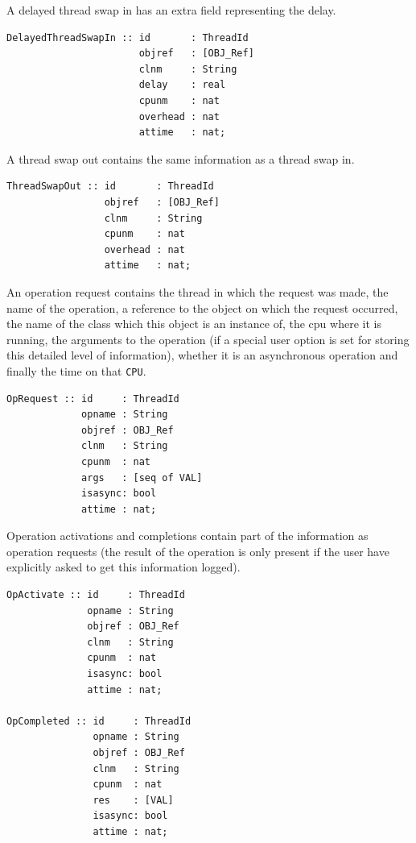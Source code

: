 \documentclass{overturerepchap}
\begin{document}
A delayed thread swap in has an extra field representing the delay.

\begin{lstlisting}
DelayedThreadSwapIn :: id       : ThreadId
                       objref   : [OBJ_Ref]
                       clnm     : String
                       delay    : real
                       cpunm    : nat
                       overhead : nat
                       attime   : nat;
\end{lstlisting}

A thread swap out contains the same information as a thread swap in.

\begin{lstlisting}
ThreadSwapOut :: id       : ThreadId
                 objref   : [OBJ_Ref]
                 clnm     : String
                 cpunm    : nat
                 overhead : nat
                 attime   : nat;
\end{lstlisting}

An operation request contains the thread in which the request was made,
the name of the operation, a reference
to the object on which the request occurred, the name of the class
which this object is an instance of, the cpu where it is running, the 
arguments to the operation (if a special user option is set for storing
this detailed level of information), whether it is an asynchronous operation
and finally the time on that \texttt{CPU}.

\begin{lstlisting}
OpRequest :: id     : ThreadId
             opname : String
             objref : OBJ_Ref
             clnm   : String
             cpunm  : nat
             args   : [seq of VAL]
             isasync: bool
             attime : nat;
\end{lstlisting}

Operation activations and completions contain part of the information as
operation requests (the result of the operation is only present if the 
user have explicitly asked to get this information logged).

\begin{lstlisting}
OpActivate :: id     : ThreadId
              opname : String
              objref : OBJ_Ref
              clnm   : String
              cpunm  : nat
              isasync: bool
              attime : nat;

OpCompleted :: id     : ThreadId
               opname : String
               objref : OBJ_Ref
               clnm   : String
               cpunm  : nat
               res    : [VAL]
               isasync: bool
               attime : nat;
\end{lstlisting}
\end{document}
